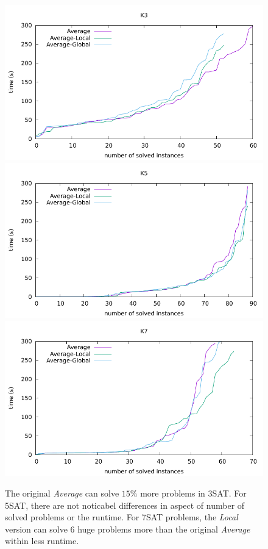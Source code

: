 \documentclass[12pt,a4paper,twoside]{scrartcl}
\numberwithin{equation}{section}
\begin{document}
  \begin{figure}[H]
\begin{center}
  \includegraphics[scale = 0.8]{DATA/K3/e3a.pdf}
    \includegraphics[scale = 0.8]{DATA/K5/e3a.pdf}
      \includegraphics[scale = 0.8]{DATA/K7/e3a.pdf}
  \end{center}
  \caption{ The original \emph{Average} can solve $15\%$ more problems in 3SAT. For 5SAT, there are not noticabel differences in aspect of number of solved problems or the runtime. For 7SAT problems, the \emph{Local} version can solve 6  huge problems more than the original \emph{Average} within less runtime.}
  \label{Experiment 4 k3 cactus plot}
  \end{figure}
\end{document}
